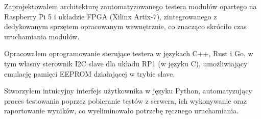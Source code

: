 \begin{zitemize}
    \item Zaprojektowałem architekturę zautomatyzowanego testera modułów opartego na Raspberry Pi 5 i układzie FPGA (Xilinx Artix-7), zintegrowanego z dedykowanym sprzętem opracowanym wewnętrznie, co znacząco skróciło czas uruchamiania modułów.
    \item Opracowałem oprogramowanie sterujące testera w językach C++, Rust i Go, w tym własny sterownik I2C slave dla układu RP1 (w języku C), umożliwiający emulację pamięci EEPROM działającej w trybie slave.
    \item Stworzyłem intuicyjny interfejs użytkownika w języku Python, automatyzujący proces testowania poprzez pobieranie testów z serwera, ich wykonywanie oraz raportowanie wyników, co wyeliminowało potrzebę ręcznego uruchamiania.
\end{zitemize}


%

